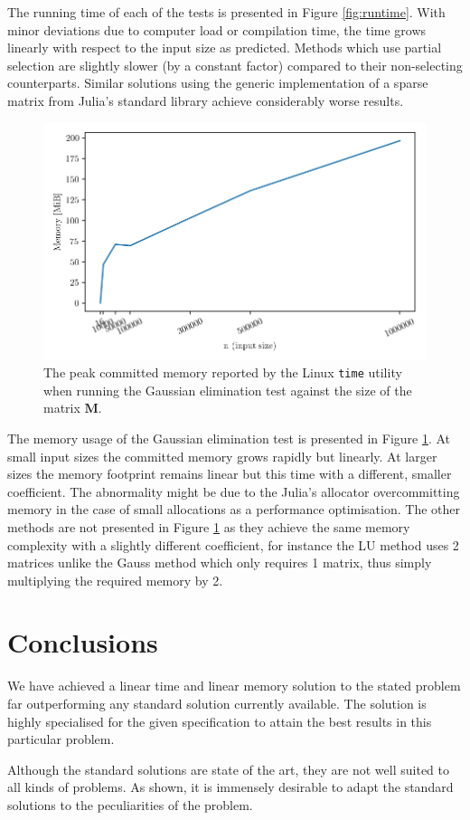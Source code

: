 \documentclass[12pt, a4paper]{article}
\newcommand{\code}[1]{\texttt{#1}}
\begin{document}
The running time of each of the tests is presented in Figure \ref{fig:runtime}.
With minor deviations due to computer load or compilation time, the time grows
linearly with respect to the input size as predicted. Methods which use partial
selection are slightly slower (by a constant factor) compared to their
non-selecting counterparts. Similar solutions using the generic implementation
of a sparse matrix from Julia's standard library achieve considerably worse
results.

\begin{figure}[ht]
\includegraphics[width=\columnwidth]{memory.png}
\caption{The peak committed memory reported by the Linux \code{time} utility
when running the Gaussian elimination test against the size of the matrix
$\bm{M}$.}
\label{fig:memory}
\end{figure}

The memory usage of the Gaussian elimination test is presented in Figure
\ref{fig:memory}. At small input sizes the committed memory grows rapidly but
linearly. At larger sizes the memory footprint remains linear but this time with
a different, smaller coefficient. The abnormality might be due to the Julia's
allocator overcommitting memory in the case of small allocations as a
performance optimisation. The other methods are not presented in Figure
\ref{fig:memory} as they achieve the same memory complexity with a slightly
different coefficient, for instance the LU method uses 2 matrices unlike the
Gauss method which only requires 1 matrix, thus simply multiplying the required
memory by 2.

\section{Conclusions}
We have achieved a linear time and linear memory solution to the stated problem
far outperforming any standard solution currently available. The solution is
highly specialised for the given specification to attain the best results in
this particular problem.

Although the standard solutions are state of the art, they are not well suited
to all kinds of problems. As shown, it is immensely desirable to adapt the
standard solutions to the peculiarities of the problem.
\end{document}
